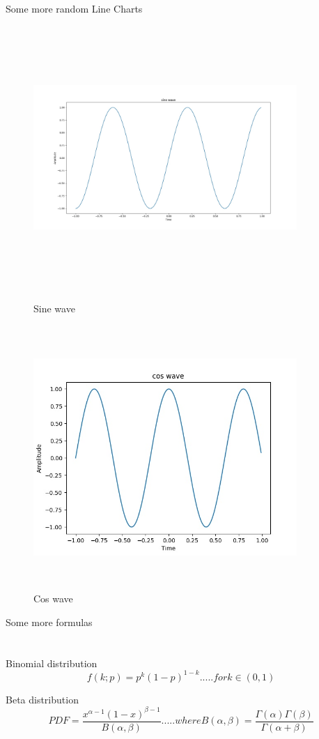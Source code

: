 \documentclass[12pt]{article}
\begin{document}
Some more random Line Charts
\begin{figure}[H]
	\centering
	\includegraphics[height=10cm,width=10cm]{image_6.jpg}
	\caption{Sine wave}
	\label{Sine wave}
	\includegraphics[height=10cm,width=10cm]{image_7.jpg}
	\caption{Cos wave}
	\label{Cos wave}
\end{figure}

Some more formulas
\\ \\ \\
Binomial distribution
\begin{equation}
	f(k;p) = p^k(1 - p)^{1-k} .....for k \in (0,1)
\end{equation}

Beta distribution
\begin{equation}
	PDF = \frac{x^{\alpha - 1}(1 - x)^{\beta - 1}}{B(\alpha,\beta)}.....where B(\alpha,\beta) = \frac{\Gamma(\alpha)\Gamma(\beta)}{\Gamma(\alpha + \beta)}
\end{equation}
\end{document}
